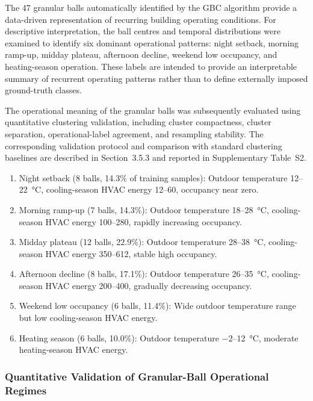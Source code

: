 \documentclass[11pt]{article}
\begin{document}
The 47 granular balls automatically identified by the GBC algorithm provide a data-driven representation of recurring building operating conditions. For descriptive interpretation, the ball centres and temporal distributions were examined to identify six dominant operational patterns: night setback, morning ramp-up, midday plateau, afternoon decline, weekend low occupancy, and heating-season operation. These labels are intended to provide an interpretable summary of recurrent operating patterns rather than to define externally imposed ground-truth classes.

The operational meaning of the granular balls was subsequently evaluated using quantitative clustering validation, including cluster compactness, cluster separation, operational-label agreement, and resampling stability. The corresponding validation protocol and comparison with standard clustering baselines are described in Section~3.5.3 and reported in Supplementary Table~S2.


\begin{enumerate}[label=(\arabic*),leftmargin=*]
\item Night setback (8 balls, 14.3\% of training samples): Outdoor temperature 12–\SI{22}{\celsius}, cooling-season HVAC energy 12–\SI{60}{\kwh}, occupancy near zero.
\item Morning ramp-up (7 balls, 14.3\%): Outdoor temperature 18–\SI{28}{\celsius}, cooling-season HVAC energy 100–\SI{280}{\kwh}, rapidly increasing occupancy.
\item Midday plateau (12 balls, 22.9\%): Outdoor temperature 28–\SI{38}{\celsius}, cooling-season HVAC energy 350–\SI{612}{\kwh}, stable high occupancy.
\item Afternoon decline (8 balls, 17.1\%): Outdoor temperature 26–\SI{35}{\celsius}, cooling-season HVAC energy 200–\SI{400}{\kwh}, gradually decreasing occupancy.
\item Weekend low occupancy (6 balls, 11.4\%): Wide outdoor temperature range but low cooling-season HVAC energy.
\item Heating season (6 balls, 10.0\%): Outdoor temperature $-2$–\SI{12}{\celsius}, moderate heating-season HVAC energy.
\end{enumerate}

\subsubsection{Quantitative Validation of Granular-Ball Operational Regimes}
\end{document}
